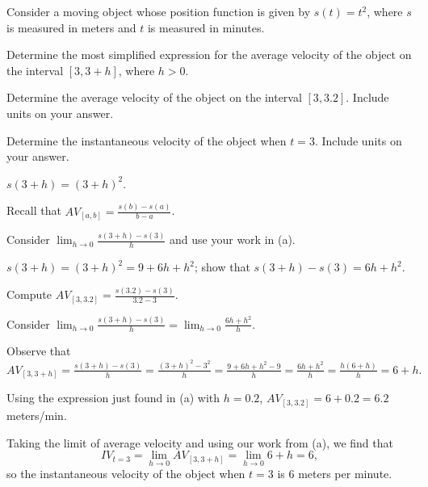 \begin{activity}  \label{A:1.2.2}
Consider a moving object whose position function is given by $s(t) = t^2$, where $s$ is measured in meters and $t$ is measured in minutes.  
\ba
	\item Determine the most simplified expression for the average velocity of the object on the interval $[3, 3+h]$, where $h > 0$.
	\item Determine the average velocity of the object on the interval $[3,3.2]$.  Include units on your answer.
	\item Determine the instantaneous velocity of the object when $t = 3$.  Include units on your answer.
\ea
\end{activity}
\begin{smallhint}
\ba
	\item $s(3+h) = (3+h)^2$.
	\item Recall that $AV_{[a,b]} = \frac{s(b)-s(a)}{b-a}$.
	\item Consider $\lim_{h \to 0} \frac{s(3+h)-s(3)}{h}$ and use your work in (a).
\ea
\end{smallhint}
\begin{bighint}
\ba
	\item $s(3+h) = (3+h)^2 = 9 + 6h + h^2$; show that $s(3+h) - s(3) = 6h + h^2$.
	\item Compute $AV_{[3,3.2]} = \frac{s(3.2)-s(3)}{3.2-3}$.
	\item Consider $\lim_{h \to 0} \frac{s(3+h)-s(3)}{h} = \lim_{h \to 0} \frac{6h + h^2}{h}$.
\ea
\end{bighint}
\begin{activitySolution}
\ba
	\item Observe that $AV_{[3, 3+h]} =  \frac{s(3+h)-s(3)}{h} = \frac{(3+h)^2 - 3^2}{h} = \frac{9 + 6h + h^2 - 9}{h} = \frac{6h + h^2}{h} = \frac{h(6 + h)}{h} = 6 + h.$
	\item Using the expression just found in (a) with $h = 0.2$, $AV_{[3,3.2]} = 6 + 0.2 = 6.2$ meters/min.
	\item Taking the limit of average velocity and using our work from (a), we find that
	$$IV_{t = 3} = \lim_{h \to 0} AV_{[3, 3+h]} = \lim_{h \to 0} 6+h = 6,$$
	so the instantaneous velocity of the object when $t = 3$ is 6 meters per minute.
\ea
\end{activitySolution}
\aftera
